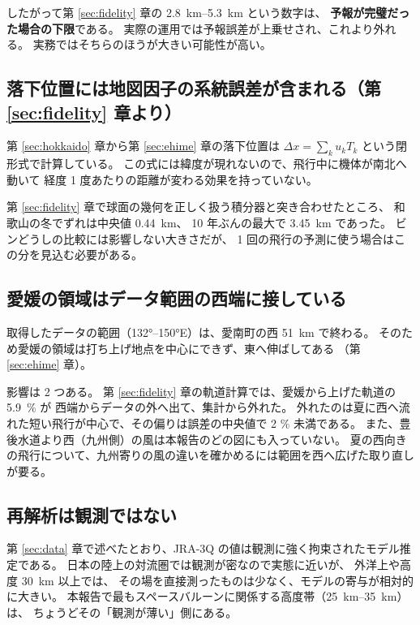 したがって第 \ref{sec:fidelity} 章の \SIrange{2.8}{5.3}{\kilo\metre} という数字は、
\textbf{予報が完璧だった場合の下限}である。
実際の運用では予報誤差が上乗せされ、これより外れる。
実務ではそちらのほうが大きい可能性が高い。

\subsection{落下位置には地図因子の系統誤差が含まれる（第 \ref{sec:fidelity} 章より）}

第 \ref{sec:hokkaido} 章から第 \ref{sec:ehime} 章の落下位置は
$\Delta x = \sum_k u_k T_k$ という閉形式で計算している。
この式には緯度が現れないので、飛行中に機体が南北へ動いて
経度 1 度あたりの距離が変わる効果を持っていない。

第 \ref{sec:fidelity} 章で球面の幾何を正しく扱う積分器と突き合わせたところ、
和歌山の冬でずれは中央値 \SI{0.44}{\kilo\metre}、
10 年ぶんの最大で \SI{3.45}{\kilo\metre} であった。
ビンどうしの比較には影響しない大きさだが、
1 回の飛行の予測に使う場合はこの分を見込む必要がある。

\subsection{愛媛の領域はデータ範囲の西端に接している}

取得したデータの範囲（\ang{132}--\ang{150}E）は、愛南町の西 \SI{51}{\kilo\metre} で終わる。
そのため愛媛の領域は打ち上げ地点を中心にできず、東へ伸ばしてある
（第 \ref{sec:ehime} 章）。

影響は 2 つある。
第 \ref{sec:fidelity} 章の軌道計算では、愛媛から上げた軌道の \SI{5.9}{\percent} が
西端からデータの外へ出て、集計から外れた。
外れたのは夏に西へ流れた短い飛行が中心で、その偏りは誤差の中央値で 2 \% 未満である。
また、豊後水道より西（九州側）の風は本報告のどの図にも入っていない。
夏の西向きの飛行について、九州寄りの風の違いを確かめるには範囲を西へ広げた取り直しが要る。

\subsection{再解析は観測ではない}

第 \ref{sec:data} 章で述べたとおり、JRA-3Q の値は観測に強く拘束されたモデル推定である。
日本の陸上の対流圏では観測が密なので実態に近いが、
外洋上や高度 \SI{30}{\kilo\metre} 以上では、
その場を直接測ったものは少なく、モデルの寄与が相対的に大きい。
本報告で最もスペースバルーンに関係する高度帯（\SIrange{25}{35}{\kilo\metre}）は、
ちょうどその「観測が薄い」側にある。

